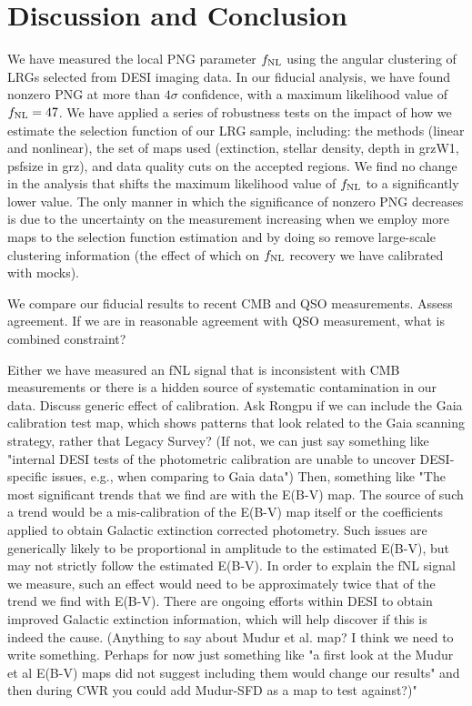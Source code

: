 \section{Discussion and Conclusion}\label{sec:conclusion}

We have measured the local PNG parameter $f_{\rm NL}$ using the angular clustering of LRGs selected from DESI imaging data. In our fiducial analysis, we have found nonzero PNG at more than $4\sigma$ confidence, with a maximum likelihood value of $f_{\rm NL}=47$. We have applied a series of robustness tests on the impact of how we estimate the selection function of our LRG sample, including: the methods (linear and nonlinear), the set of maps used (extinction, stellar density, depth in grzW1, psfsize in grz), and data quality cuts on the accepted regions. We find no change in the analysis that shifts the maximum likelihood value of $f_{\rm NL}$ to a significantly lower value. The only manner in which the significance of nonzero PNG decreases is due to the uncertainty on the measurement increasing when we employ more maps to the selection function estimation and by doing so remove large-scale clustering information (the effect of which on $f_{\rm NL}$ recovery we have calibrated with mocks).

We compare our fiducial results to recent CMB and QSO measurements. Assess agreement. If we are in reasonable agreement with QSO measurement, what is combined constraint?

Either we have measured an fNL signal that is inconsistent with CMB measurements or there is a hidden source of systematic contamination in our data. Discuss generic effect of calibration. Ask Rongpu if we can include the Gaia calibration test map, which shows patterns that look related to the Gaia scanning strategy, rather that Legacy Survey? (If not, we can just say something like "internal DESI tests of the photometric calibration are unable to uncover DESI-specific issues, e.g., when comparing to Gaia data") Then, something like "The most significant trends that we find are with the E(B-V) map. The source of such a trend would be a mis-calibration of the E(B-V) map itself or the coefficients applied to obtain Galactic extinction corrected photometry. Such issues are generically likely to be proportional in amplitude to the estimated E(B-V), but may not strictly follow the estimated E(B-V). In order to explain the fNL signal we measure, such an effect would need to be approximately twice that of the trend we find with E(B-V). There are ongoing efforts within DESI to obtain improved Galactic extinction information, which will help discover if this is indeed the cause. (Anything to say about Mudur et al. map? I think we need to write something. Perhaps for now just something like "a first look at the Mudur et al E(B-V) maps did not suggest including them would change our results" and then during CWR you could add Mudur-SFD as a map to test against?)"



